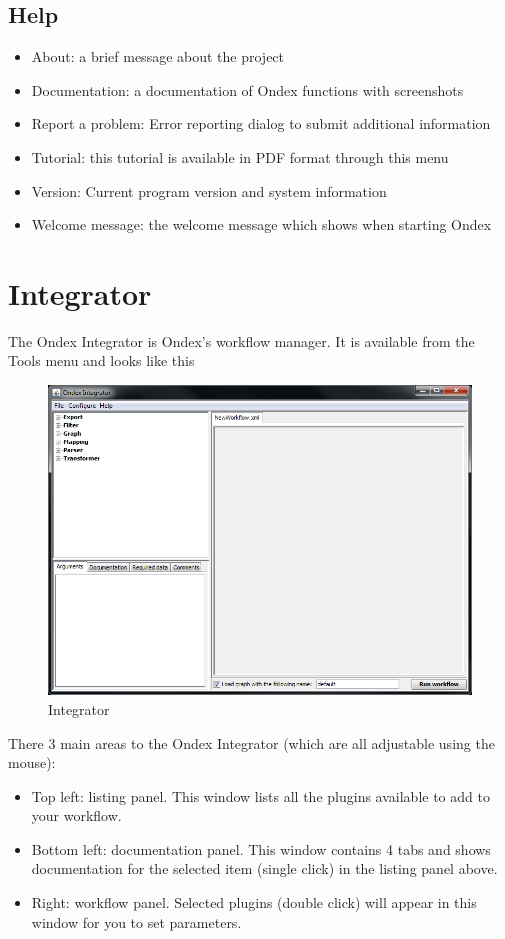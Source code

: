 \subsection{Help}
\label{sec:menu_help}
\begin{itemize}
\item About: a brief message about the project
\item Documentation: a documentation of Ondex functions with screenshots
\item Report a problem: Error reporting dialog to submit additional information
\item Tutorial: this tutorial is available in PDF format through this menu
\item Version: Current program version and system information
\item Welcome message: the welcome message which shows when starting Ondex
\end{itemize}



\newpage
\section{Integrator}
\label{sec:ref_integrator}
The Ondex Integrator is Ondex's workflow manager. It is available from the Tools menu and looks like this
\begin{figure}[H]
\centering
\includegraphics[scale=0.55]{images/Oct12/integrator.png} 
\caption{Integrator}
\label{fig:integrator}
\end{figure}
There 3 main areas to the Ondex Integrator (which are all adjustable using the mouse):
\begin{itemize}
\item Top left: listing panel.
This window lists all the plugins available to add to your workflow.
\item Bottom left: documentation panel.
This window contains 4 tabs and shows documentation for the selected item (single click) in the listing panel above.
\item Right: workflow panel.
Selected plugins (double click) will appear in this window for you to set parameters.
\end{itemize}

